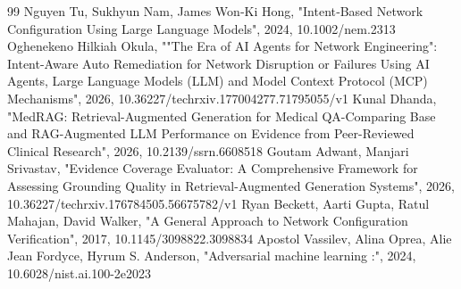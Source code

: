 \documentclass[conference]{IEEEtran}
\begin{document}
\begin{thebibliography}{99}
 Nguyen Tu, Sukhyun Nam, James Won‐Ki Hong, "Intent‐Based Network Configuration Using Large Language Models", 2024, 10.1002/nem.2313
 Oghenekeno Hilkiah Okula, ""The Era of AI Agents for Network Engineering": Intent-Aware Auto Remediation for Network Disruption or Failures Using AI Agents, Large Language Models (LLM) and Model Context Protocol (MCP) Mechanisms", 2026, 10.36227/techrxiv.177004277.71795055/v1
 Kunal Dhanda, "MedRAG: Retrieval-Augmented Generation for Medical QA-Comparing Base and RAG-Augmented LLM Performance on Evidence from Peer-Reviewed Clinical Research", 2026, 10.2139/ssrn.6608518
 Goutam Adwant, Manjari Srivastav, "Evidence Coverage Evaluator: A Comprehensive Framework for Assessing Grounding Quality in Retrieval-Augmented Generation Systems", 2026, 10.36227/techrxiv.176784505.56675782/v1
 Ryan Beckett, Aarti Gupta, Ratul Mahajan, David Walker, "A General Approach to Network Configuration Verification", 2017, 10.1145/3098822.3098834
 Apostol Vassilev, Alina Oprea, Alie Jean Fordyce, Hyrum S. Anderson, "Adversarial machine learning :", 2024, 10.6028/nist.ai.100-2e2023
\end{thebibliography}
\end{document}
